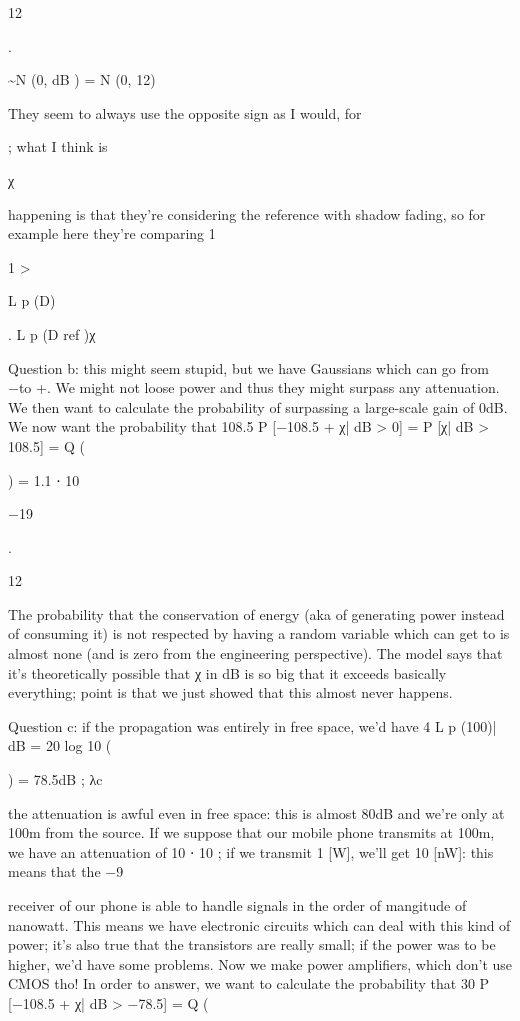{{{{12

.

\sim N (0, \sigma dB ) = N (0, 12)

They seem to always use the opposite sign as I would, for

; what I think is

χ

happening is that they're considering the reference with shadow fading, so for example here they're comparing 1

1
>

L p (D)

.
L p (D ref )χ

Question b: this might seem stupid, but we have Gaussians which can go from −\infty to
+\infty. We might not loose power and thus they might surpass any attenuation. We then want to calculate the probability of surpassing a large-scale gain of 0dB.
We now want the probability that 108.5 P [−108.5 + χ| dB > 0] = P [χ| dB > 108.5] = Q (

) = 1.1 ⋅ 10

−19

.

12

The probability that the conservation of energy (aka of generating power instead of consuming it) is not respected by having a random variable which can get to \infty is almost none (and is zero from the engineering perspective).
The model says that it's theoretically possible that χ in dB is so big that it exceeds basically everything; point is that we just showed that this almost never happens.

Question c: if the propagation was entirely in free space, we'd have 4 L p (100)| dB = 20 log 10 (

) = 78.5dB ;
λc

the attenuation is awful even in free space: this is almost 80dB and we're only at 100m from the source. If we suppose that our mobile phone transmits at 100m, we have an attenuation of 10 ⋅ 10 ; if we transmit 1 [W], we'll get 10 [nW]: this means that the
−9

receiver of our phone is able to handle signals in the order of mangitude of nanowatt.
This means we have electronic circuits which can deal with this kind of power; it's also true that the transistors are really small; if the power was to be higher, we'd have some problems.
Now we make power amplifiers, which don't use CMOS tho!
In order to answer, we want to calculate the probability that 30 P [−108.5 + χ| dB > −78.5] = Q (

}}}}
